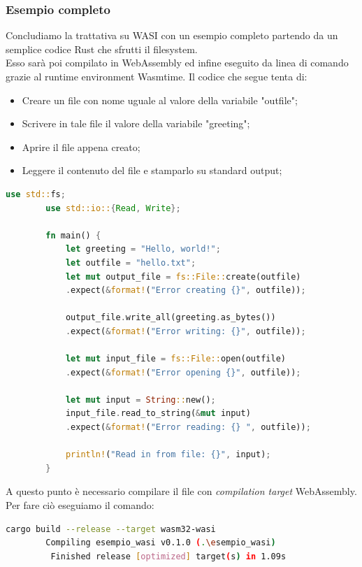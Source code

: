 \subsubsection{Esempio completo}
Concludiamo la trattativa su WASI con un esempio completo partendo da un semplice codice Rust che sfrutti il filesystem.
\\Esso sarà poi compilato in WebAssembly ed infine eseguito da linea di comando grazie al runtime environment Wasmtime.
Il codice che segue tenta di:
\begin{itemize}
        \item Creare un file con nome uguale al valore della variabile "outfile";
        \item Scrivere in tale file il valore della variabile "greeting";
        \item Aprire il file appena creato;
        \item Leggere il contenuto del file e stamparlo su standard output;
\end{itemize}
\begin{lstlisting}[language=rust, label=lst:RustWasi, caption={Esempio in Rust}, showstringspaces=false]
        use std::fs;
        use std::io::{Read, Write};
                
        fn main() {
            let greeting = "Hello, world!";
            let outfile = "hello.txt";
            let mut output_file = fs::File::create(outfile)
            .expect(&format!("Error creating {}", outfile));

            output_file.write_all(greeting.as_bytes())
            .expect(&format!("Error writing: {}", outfile));
        
            let mut input_file = fs::File::open(outfile)
            .expect(&format!("Error opening {}", outfile));
        
            let mut input = String::new();
            input_file.read_to_string(&mut input)
            .expect(&format!("Error reading: {} ", outfile));
        
            println!("Read in from file: {}", input);
        }
\end{lstlisting}
A questo punto è necessario compilare il file con \emph{compilation target} WebAssembly. Per fare ciò eseguiamo il comando:
\begin{lstlisting}[language=Bash, numbers=none]
cargo build --release --target wasm32-wasi
        Compiling esempio_wasi v0.1.0 (.\esempio_wasi)
         Finished release [optimized] target(s) in 1.09s
\end{lstlisting}
